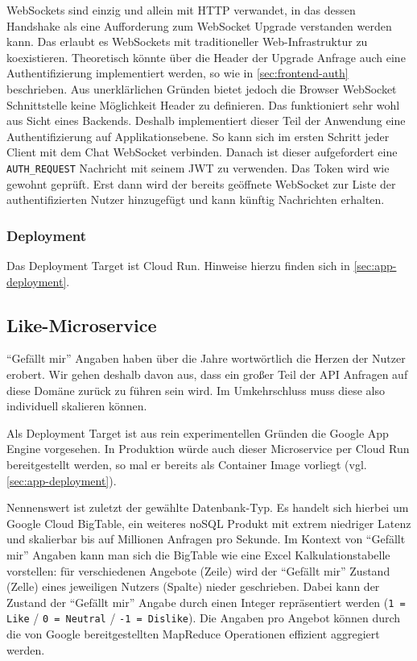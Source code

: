 \documentclass{article}
\begin{document}
WebSockets sind einzig und allein mit HTTP verwandet, in das dessen Handshake als eine Aufforderung zum WebSocket Upgrade verstanden werden kann. Das erlaubt es WebSockets mit traditioneller Web-Infrastruktur zu koexistieren. Theoretisch könnte über die Header der Upgrade Anfrage auch eine Authentifizierung implementiert werden, so wie in \autoref{sec:frontend-auth} beschrieben. Aus unerklärlichen Gründen bietet jedoch die Browser WebSocket Schnittstelle keine Möglichkeit Header zu definieren. Das funktioniert sehr wohl aus Sicht eines Backends. Deshalb implementiert dieser Teil der Anwendung eine Authentifizierung auf Applikationsebene. So kann sich im ersten Schritt jeder Client mit dem Chat WebSocket verbinden. Danach ist dieser aufgefordert eine \texttt{AUTH\_REQUEST} Nachricht mit seinem JWT zu verwenden. Das Token wird wie gewohnt geprüft. Erst dann wird der bereits geöffnete WebSocket zur Liste der authentifizierten Nutzer hinzugefügt und kann künftig Nachrichten erhalten.


\subsubsection{Deployment}

Das Deployment Target ist Cloud Run. Hinweise hierzu finden sich in \autoref{sec:app-deployment}.


\subsection{Like-Microservice}


\enquote{Gefällt mir} Angaben haben über die Jahre wortwörtlich die Herzen der Nutzer erobert. Wir gehen deshalb davon aus, dass ein großer Teil der API Anfragen auf diese Domäne zurück zu führen sein wird. Im Umkehrschluss muss diese also individuell skalieren können. 

Als Deployment Target ist aus rein experimentellen Gründen die Google App Engine vorgesehen. In Produktion würde auch dieser Microservice per Cloud Run bereitgestellt werden, so mal er bereits als Container Image vorliegt (vgl. \autoref{sec:app-deployment}).

Nennenswert ist zuletzt der gewählte Datenbank-Typ. Es handelt sich hierbei um Google Cloud BigTable, ein weiteres noSQL Produkt mit extrem niedriger Latenz und skalierbar bis auf Millionen Anfragen pro Sekunde. Im Kontext von \enquote{Gefällt mir} Angaben kann man sich die BigTable wie eine Excel Kalkulationstabelle vorstellen: für verschiedenen Angebote (Zeile) wird der \enquote{Gefällt mir} Zustand (Zelle) eines jeweiligen Nutzers (Spalte) nieder geschrieben. Dabei kann der Zustand der \enquote{Gefällt mir} Angabe durch einen Integer repräsentiert werden (\texttt{1 = Like} / \texttt{0 = Neutral} / \texttt{-1 = Dislike}). Die Angaben pro Angebot können durch die von Google bereitgestellten MapReduce Operationen effizient aggregiert werden.
\end{document}
